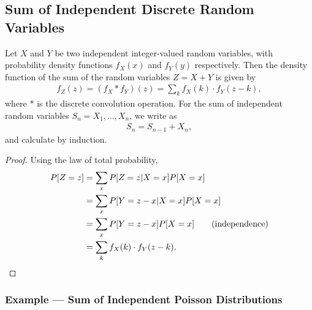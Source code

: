 \subsection*{Sum of Independent Discrete Random Variables}

\begin{theorem}\label{thrm:2}
	Let $X$ and $Y$ be two independent integer-valued random variables, with probability density functions $f_X(x)$ and $f_Y(y)$ respectively. Then the density function of the sum of the random variables $Z = X + Y$ is given by
	\begin{align*}
	f_Z(z) = (f_X * f_Y)(z) = \sum_k f_X(k)\cdot f_Y(z-k),
	\end{align*}
	where $*$ is the discrete convolution operation. For the sum of independent random variables $S_n = X_1, \ldots, X_n$, we write as
	\begin{align*}
	S_n = S_{n-1} + X_n,
	\end{align*}
	and calculate by induction.
\end{theorem}
\begin{proof}
	Using the law of total probability,
	\begin{align*}
	P[Z = z] & = \sum_{x} P[Z = z|X = x]P[X = x] \\
	& = \sum_{x} P[Y = z-x|X = x]P[X = x] \\
	& = \sum_{x} P[Y = z-x]P[X = x] \qquad (\mathrm{independence})\\
	& = \sum_k f_X(k)\cdot f_Y(z-k).
	\end{align*}
\end{proof}

\subsubsection*{Example --- Sum of Independent Poisson Distributions}

